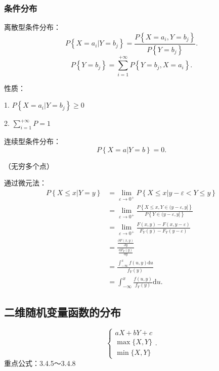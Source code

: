 \subsubsection{条件分布}%
\label{subsub:条件分布}
\begin{notation}
    离散型条件分布：
    \[
        P\left\{ X=a_i|Y=b_j \right\} =\frac{P\left\{ X=a_i,Y=b_j \right\} }{P\left\{ Y=b_j \right\} }
    .\] 
    \[
        P\left\{ Y=b_j \right\} =\sum_{i=1}^{+\infty} P\left\{ Y=b_j,X=a_i \right\} 
    .\] 

    性质：

    1. $P\left\{ X=a_i|Y=b_j \right\} \ge 0$

    2. ${\sum_{i=1}^{+\infty} P=1}$
\end{notation}
\begin{notation}
    连续型条件分布：
    \[
        P\left\{ X=a|Y=b \right\} =0
    .\] 

    （无穷多个点）

    通过微元法：
    \begin{align*}
        P\left\{ X\le x|Y=y \right\} &=\lim_{\varepsilon \to 0^{+}} P\left\{ X\le x|y-\varepsilon < Y \le y \right\} \\
                                     &= \lim_{\varepsilon \to 0^+} \frac{P\left\{ X\le x,Y\in (y-\varepsilon,y] \right\} }{P\left\{ Y\in (y-\varepsilon,y] \right\} } \\
                                     &= \lim_{\varepsilon \to 0^+} \frac{F\left( x,y \right) -F\left( x,y-\varepsilon \right) }{F_{Y}\left( y \right) -F_{Y}\left( y-\varepsilon \right) } \\
                                     &= \frac{{\frac{\partial F\left( x,y \right) }{\partial y} }}{{\frac{\mathrm{d}F_Y\left( y \right) }{\mathrm{d}y}}} \\
                                     &= \frac{{\int_{-\infty}^{x} f\left( u,y \right) \mathrm{d}u}}{f_{Y}\left( y \right) } \\
                                     &= \int_{-\infty}^{x} \frac{f\left( u,y \right) }{f_{Y}\left( y \right) } \mathrm{d}u
    .\end{align*}
\end{notation}
\subsection{二维随机变量函数的分布}%
\label{sub:二维随机变量函数的分布}
\[
    \begin{cases}
        aX+bY+c\\
        \max\{X,Y\}\\
        \min\{X,Y\}
    \end{cases}
.\] 
重点公式：3.4.5～3.4.8

